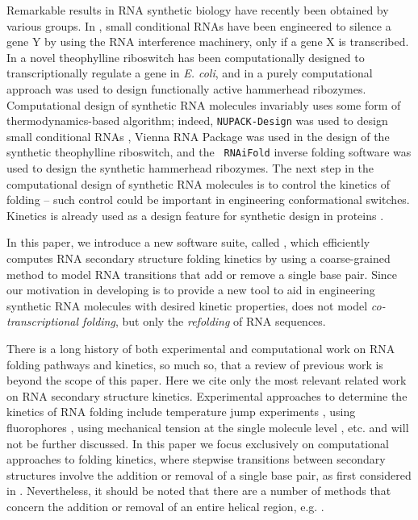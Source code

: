 Remarkable results in RNA synthetic biology have recently been
obtained by various groups. In \cite{Hochrein.jacs13}, small
conditional RNAs have been engineered to silence a gene Y by using the
RNA interference machinery, only if a gene X is transcribed. In
\cite{Wachsmuth.nar13} a novel theophylline riboswitch has been
computationally designed to transcriptionally regulate a gene in {\em
E. coli}, and in \cite{syntheticHammerheads} a purely computational
approach was used to design functionally active hammerhead ribozymes.
Computational design of synthetic RNA molecules invariably uses some
form of thermodynamics-based algorithm; indeed, {\tt NUPACK-Design}
\cite{Zadeh.jcc11} was used to design small conditional RNAs
\cite{Hochrein.jacs13}, Vienna RNA Package \cite{Gruber08} was used in
the design of the synthetic theophylline riboswitch, and the {\tt
RNAiFold} inverse folding software
\cite{garcia.JBCBB13,GarciaMartin.nar13} was used to design the
synthetic hammerhead ribozymes. The next step in the computational
design of synthetic RNA molecules is to control the kinetics of
folding -- such control could be important in engineering
conformational switches. Kinetics is already used as a design feature
for synthetic design in proteins \cite{Bujotzek.jcam11,Fasting.acie12}.

In this paper, we introduce a new software suite, called \hermes,
which efficiently computes RNA secondary structure
folding kinetics by using a coarse-grained
method to model RNA transitions that add or remove a single base pair.
Since our motivation in developing \hermes is to provide a new
tool to aid in engineering synthetic RNA molecules with desired
kinetic properties, \hermes does not model {\em co-transcriptional
folding}, but only the {\em refolding} of RNA sequences.

There is a long history of both experimental and computational work on
RNA folding pathways and kinetics, so much so, that a review of
previous work is beyond the scope of this paper. Here we cite only the
most relevant related work on RNA secondary structure
kinetics. Experimental approaches to
determine the kinetics of RNA folding include temperature jump
experiments \cite{lecuyerCrothers}, using fluorophores
\cite{Hobartner.jmb03}, using mechanical tension at the single
molecule level \cite{Vieregg.mp06}, etc. and will not be further
discussed. In this paper we focus exclusively on computational
approaches to folding kinetics, where stepwise transitions between
secondary structures involve the addition or removal of a single base
pair, as first considered in \cite{flammHofacker}.
Nevertheless, it should be noted that there are a number of
methods that concern the addition or removal of an entire helical
region, e.g. \cite{Huang.bb14,Zhao.jcp11}.

